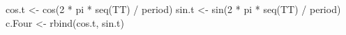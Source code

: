 \begin{Schunk}
\begin{Sinput}
 cos.t <- cos(2 * pi * seq(TT) / period)
 sin.t <- sin(2 * pi * seq(TT) / period)
 c.Four <- rbind(cos.t, sin.t)
\end{Sinput}
\end{Schunk}
